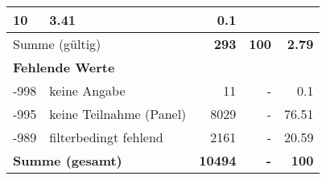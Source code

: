 \begin{longtable}{lXrrr}
       \num{10} &
       \num[round-mode=places,round-precision=2]{3.41} &
         \num[round-mode=places,round-precision=2]{0.1} \\
     \midrule
     \multicolumn{2}{l}{Summe (gültig)} &
       \textbf{\num{293}} &
     \textbf{\num{100}} &
       \textbf{\num[round-mode=places,round-precision=2]{2.79}} \\
     \multicolumn{5}{l}{\textbf{Fehlende Werte}}\\
       -998 &
       keine Angabe &
         \num{11} &
        - &
         \num[round-mode=places,round-precision=2]{0.1} \\
       -995 &
       keine Teilnahme (Panel) &
         \num{8029} &
        - &
         \num[round-mode=places,round-precision=2]{76.51} \\
       -989 &
       filterbedingt fehlend &
         \num{2161} &
        - &
         \num[round-mode=places,round-precision=2]{20.59} \\
     \midrule
     \multicolumn{2}{l}{\textbf{Summe (gesamt)}} &
          \textbf{\num{10494}} &
        \textbf{-} &
        \textbf{\num{100}} \\
     \bottomrule
     \end{longtable}
     
